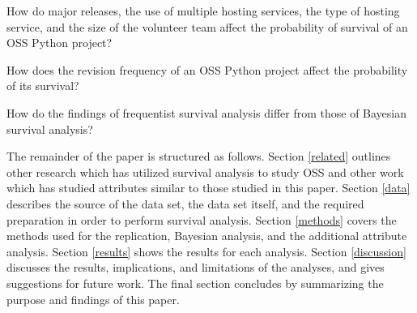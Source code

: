 \documentclass[sigconf]{acmart}
\begin{document}
\begin{questions}
    \item How do major releases, the use of multiple hosting services, the type of hosting service, and the size of the volunteer team affect the probability of survival of an OSS Python project?
    \item How does the revision frequency of an OSS Python project affect the probability of its survival?
    \item How do the findings of frequentist survival analysis differ from those of Bayesian survival analysis?
\end{questions}

The remainder of the paper is structured as follows. 
Section \ref{related} outlines other research which has utilized survival analysis to study OSS and other work which has studied attributes similar to those studied in this paper.
Section \ref{data} describes the source of the data set, the data set itself, and the required preparation in order to perform survival analysis.
Section \ref{methods} covers the methods used for the replication, Bayesian analysis, and the additional attribute analysis.
Section \ref{results} shows the results for each analysis.
Section \ref{discussion} discusses the results, implications, and limitations of the analyses, and gives suggestions for future work.
The final section concludes by summarizing the purpose and findings of this paper.
\end{document}

